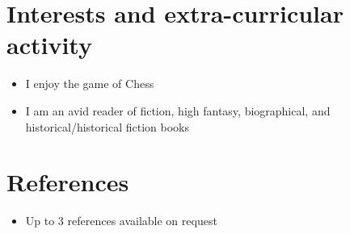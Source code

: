 \documentclass[11pt,a4paper,sans]{moderncv}        %
\begin{document}
\section{Interests and extra-curricular activity}

\vspace{6pt}

\begin{itemize}

\item{I enjoy the game of Chess}

\vspace{6pt}

\item{I am an avid reader of fiction, high fantasy, biographical, and historical/historical fiction books}

\end{itemize}

\section{References}

\vspace{6pt}
 
\begin{itemize}

\item{Up to 3 references available on request}

\end{itemize}

\nocite{*}



\end{document}

